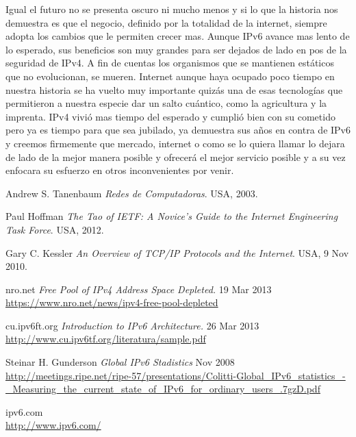 \documentclass[11pt,a4paper]{article}
\begin{document}
Igual el futuro no se presenta oscuro ni mucho menos y si lo que la historia nos demuestra es que el 
negocio, definido por la totalidad de la internet, siempre adopta los cambios que le permiten crecer 
mas. Aunque IPv6 avance mas lento de lo esperado, sus beneficios son muy grandes para ser dejados de 
lado en pos de la seguridad de IPv4. A fin de cuentas los organismos que se mantienen estáticos que
no evolucionan, se mueren. Internet aunque haya ocupado poco tiempo en nuestra historia se ha 
vuelto muy importante quizás una de esas tecnologías que permitieron a nuestra especie dar un salto 
cuántico, como la agricultura y la imprenta. IPv4 vivió mas tiempo del esperado y cumplió bien con 
su cometido pero ya es tiempo para que sea jubilado, ya demuestra sus años en contra de IPv6 y 
creemos firmemente que mercado, internet o como se lo quiera llamar lo dejara de lado de la mejor 
manera posible y ofrecerá el mejor servicio posible y a su vez enfocara su esfuerzo en otros 
inconvenientes por venir.

\newpage
\begin{thebibliography}{9}

  Andrew S. Tanenbaum
  \emph{Redes de Computadoras}.
  USA,
  2003.

  Paul Hoffman
  \emph{The Tao of IETF: A Novice's Guide to the Internet Engineering Task Force}.
  USA,
  2012.
		
  Gary C. Kessler
  \emph{An Overview of TCP/IP Protocols and the Internet}.
  USA,
  9 Nov 2010.
		
 nro.net
 \emph{Free Pool of IPv4 Address Space Depleted.} 
 19 Mar 2013\\
	\url{https://www.nro.net/news/ipv4-free-pool-depleted}	

 cu.ipv6ft.org 
 \emph{Introduction to IPv6 Architecture.} 
 26 Mar 2013\\
	\url{http://www.cu.ipv6tf.org/literatura/sample.pdf}

 Steinar H. Gunderson
 \emph{Global IPv6 Stadistics}
 Nov 2008\\
 \url{http://meetings.ripe.net/ripe-57/presentations/Colitti-Global_IPv6_statistics_-
 _Measuring_the_current_state_of_IPv6_for_ordinary_users_.7gzD.pdf}
		
 ipv6.com\\
 \url{http://www.ipv6.com/}		
					
\end{thebibliography}
\end{document}
